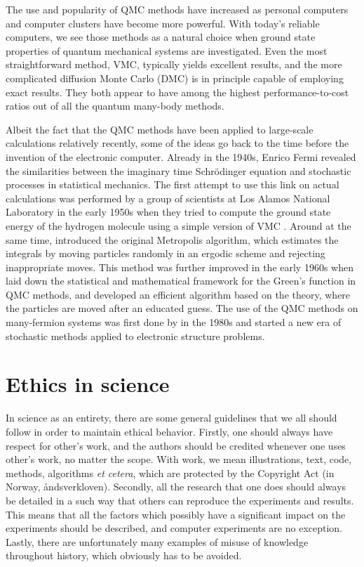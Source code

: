 The use and popularity of QMC methods have increased as personal computers and computer clusters have become more powerful. With today's reliable computers, we see those methods as a natural choice when ground state properties of quantum mechanical systems are investigated. Even the most straightforward method, VMC, typically yields excellent results, and the more complicated diffusion Monte Carlo (DMC) is in principle capable of employing exact results. They both appear to have among the highest performance-to-cost ratios out of all the quantum many-body methods. 

Albeit the fact that the QMC methods have been applied to large-scale calculations relatively recently, some of the ideas go back to the time before the invention of the electronic computer. Already in the 1940s, Enrico Fermi revealed the similarities between the imaginary time Schrödinger equation and stochastic processes in statistical mechanics. The first attempt to use this link on actual calculations was performed by a group of scientists at Los Alamos National Laboratory in the early 1950s when they tried to compute the ground state energy of the hydrogen molecule using a simple version of VMC \cite{bajdich_electronic_2010}. Around at the same time, \citet{metropolis_monte_1949} introduced the original Metropolis algorithm, which estimates the integrals by moving particles randomly in an ergodic scheme and rejecting inappropriate moves. This method was further improved in the early 1960s when \citet{kalos} laid down the statistical and mathematical framework for the Green's function in QMC methods, and \citet{hastings_monte_1970} developed an efficient algorithm based on the theory, where the particles are moved after an educated guess. The use of the QMC methods on many-fermion systems was first done by \citet{ceperley_quantum_1986} in the 1980s and started a new era of stochastic methods applied to electronic structure problems. 

\section{Ethics in science}
In science as an entirety, there are some general guidelines that we all should follow in order to maintain ethical behavior. Firstly, one should always have respect for other's work, and the authors should be credited whenever one uses other's work, no matter the scope. With work, we mean illustrations, text, code, methods, algorithms \textit{et cetera}, which are protected by the Copyright Act (in Norway, åndsverkloven). Secondly, all the research that one does should always be detailed in a such way that others can reproduce the experiments and results. This means that all the factors which possibly have a significant impact on the experiments should be described, and computer experiments are no exception. Lastly, there are unfortunately many examples of misuse of knowledge throughout history, which obviously has to be avoided.

